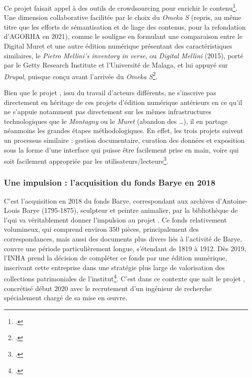 Ce projet faisait appel à des outils de crowdsourcing pour enrichir le contenu\footcite[p.53]{courtin_rapport_2019}. Une dimension collaborative facilitée par le choix du \cms \textit{Omeka S} (repris, au même titre que les efforts de sémantisation et de liage des contenus, pour la refondation d’AGORHA en 2021), comme le souligne \citeauthor{chateau-dutier_editions_2021} en formulant une comparaison entre le Digital Muret et une autre édition numérique présentant des caractéristiques similaires, le \textit{Pietro Mellini’s inventory in verse}, ou \textit{Digital Mellini} (2015), porté par le Getty Research Institute et l’Université de Malaga, et lui appuyé sur \textit{Drupal}, puisque conçu avant l’arrivée du \cms \textit{Omeka S}\footcite{daniel_digital_2014}.

Bien que le projet \pense, issu du travail d’acteurs différents, ne s’inscrive pas directement en héritage de ces projets d’édition numérique antérieurs en ce qu’il ne s’appuie notamment pas directement sur les mêmes infrastructures technologiques que le \textit{Montagny} ou le \textit{Muret} (abandon des \cms…), il en partage néanmoins les grandes étapes méthodologiques. En effet, les trois projets suivent un processus similaire : gestion documentaire, curation des données et exposition sous la forme d’une interface qui puisse être facilement prise en main, voire qui soit facilement appropriée par les utilisateurs/lecteurs\footcite{colonna_digital_2024}.

\subsubsection{Une impulsion : l’acquisition du fonds Barye en 2018}

C’est l’acquisition en 2018 du fonds Barye, correspondant aux archives d’Antoine-Louis Barye (1795-1875), sculpteur et peintre animalier, par la bibliothèque de l’\inha qui va véritablement donner l’impulsion au projet \pense. Ce fonds relativement volumineux, qui comprend environ 350 pièces, principalement des correspondances, mais aussi des documents plus divers liés à l'activité de Barye, couvre une période particulièrement longue, s’étendant de 1819 à 1912. Dès 2019, l’INHA prend la décision de compléter ce fonds par une édition numérique, inscrivant cette entreprise dans une stratégie plus large de valorisation des collections patrimoniales de l’institut\footcite{inha_edition_nodate}. 
C’est dans ce contexte que naît le projet \pense, concrétisé début 2020 avec le recrutement d’un ingénieur de recherche spécialement chargé de sa mise en œuvre.


